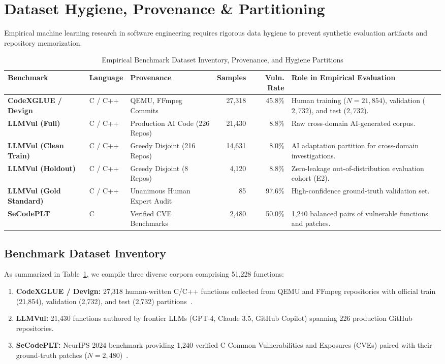 \documentclass[conference]{IEEEtran}
\begin{document}
\section{Dataset Hygiene, Provenance \& Partitioning}

Empirical machine learning research in software engineering requires rigorous data hygiene to prevent synthetic evaluation artifacts and repository memorization.

\begin{table}[t]
\centering
\caption{Empirical Benchmark Dataset Inventory, Provenance, and Hygiene Partitions}
\label{tab:datasets}
\begin{tabular}{@{}lllrrp{5.5cm}@{}}
\toprule
\textbf{Benchmark} & \textbf{Language} & \textbf{Provenance} & \textbf{Samples} & \textbf{Vuln. Rate} & \textbf{Role in Empirical Evaluation} \\
\midrule
\textbf{CodeXGLUE / Devign} & C / C++ & QEMU, FFmpeg Commits & 27,318 & 45.8\% & Human training ($N=21,854$), validation ($2,732$), and test ($2,732$). \\
\textbf{LLMVul (Full)} & C / C++ & Production AI Code (226 Repos) & 21,430 & 8.8\% & Raw cross-domain AI-generated corpus. \\
\textbf{LLMVul (Clean Train)} & C / C++ & Greedy Disjoint (216 Repos) & 14,631 & 8.0\% & AI adaptation partition for cross-domain investigations. \\
\textbf{LLMVul (Holdout)} & C / C++ & Greedy Disjoint (8 Repos) & 4,120 & 8.8\% & Zero-leakage out-of-distribution evaluation cohort (E2). \\
\textbf{LLMVul (Gold Standard)} & C / C++ & Unanimous Human Expert Audit & 85 & 97.6\% & High-confidence ground-truth validation set. \\
\textbf{SeCodePLT} & C & Verified CVE Benchmarks & 2,480 & 50.0\% & 1,240 balanced pairs of vulnerable functions and patches. \\
\bottomrule
\end{tabular}
\end{table}

\subsection{Benchmark Dataset Inventory}
As summarized in Table~\ref{tab:datasets}, we compile three diverse corpora comprising 51,228 functions:
\begin{enumerate}
    \item \textbf{CodeXGLUE / Devign:} 27,318 human-written C/C++ functions collected from QEMU and FFmpeg repositories with official train (21,854), validation (2,732), and test (2,732) partitions~\cite{zhou2019devign, lu2021codexglue}.
    \item \textbf{LLMVul:} 21,430 functions authored by frontier LLMs (GPT-4, Claude 3.5, GitHub Copilot) spanning 226 production GitHub repositories.
    \item \textbf{SeCodePLT:} NeurIPS 2024 benchmark providing 1,240 verified C Common Vulnerabilities and Exposures (CVEs) paired with their ground-truth patches ($N=2,480$)~\cite{secodeplt2024}.
\end{enumerate}
\end{document}

